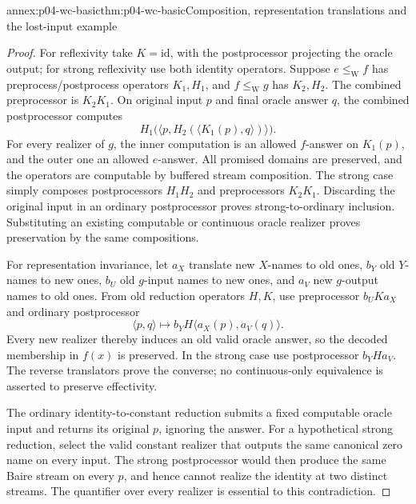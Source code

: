 
\begin{annexitem}{annex:p04-wc-basic}{thm:p04-wc-basic}{Composition, representation translations and the lost-input example}
\begin{proof}
For reflexivity take \(K=\mathrm{id}\), with the postprocessor projecting
the oracle output; for strong reflexivity use both identity operators.
Suppose \(e\leq_{\mathrm W} f\) has preprocess/postprocess operators
\(K_1,H_1\), and \(f\leq_{\mathrm W} g\) has \(K_2,H_2\).
The combined preprocessor is \(K_2K_1\). On original input \(p\)
and final oracle answer \(q\), the combined postprocessor computes
\[
 H_1\bigl(\langle p,H_2(\langle K_1(p),q\rangle)\rangle\bigr).
\]
For every realizer of \(g\), the inner computation is an allowed
\(f\)-answer on \(K_1(p)\), and the outer one an allowed \(e\)-answer.
All promised domains are preserved, and the operators are computable
by buffered stream composition. The strong case simply composes
postprocessors \(H_1H_2\) and preprocessors \(K_2K_1\).
Discarding the original input in an ordinary postprocessor proves
strong-to-ordinary inclusion. Substituting an existing computable or
continuous oracle realizer proves preservation by the same compositions.

For representation invariance, let \(a_X\) translate new \(X\)-names
to old ones, \(b_Y\) old \(Y\)-names to new ones,
\(b_U\) old \(g\)-input names to new ones, and \(a_V\) new
\(g\)-output names to old ones. From old reduction operators \(H,K\),
use preprocessor \(b_UKa_X\) and ordinary postprocessor
\[
 \langle p,q\rangle\longmapsto
 b_YH\langle a_X(p),a_V(q)\rangle.
\]
Every new realizer thereby induces an old valid oracle answer, so the
decoded membership in \(f(x)\) is preserved. In the strong case use
postprocessor \(b_YHa_V\). The reverse translators prove the converse;
no continuous-only equivalence is asserted to preserve effectivity.

The ordinary identity-to-constant reduction submits a fixed computable
oracle input and returns its original \(p\), ignoring the answer.
For a hypothetical strong reduction, select the valid constant realizer
that outputs the same canonical zero name on every input. The strong
postprocessor would then produce the same Baire stream on every \(p\),
and hence cannot realize the identity at two distinct streams.
The quantifier over every realizer is essential to this contradiction.
\end{proof}
\end{annexitem}

